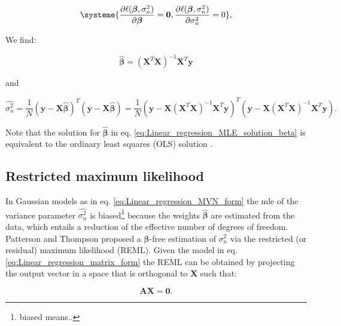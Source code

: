 \begin{equation} \label{eq:Linear_regression_MLE_system}
\systeme{
    \dfrac{\partial \ell(\boldsymbol{\beta}, \sigma_n^2)}{\partial \boldsymbol{\beta}} = \mathbf{0},
    \dfrac{\partial \ell(\boldsymbol{\beta}, \sigma_n^2)}{\partial \sigma_n^2} = 0
    },
\end{equation}

We find:

\begin{equation} \label{eq:Linear_regression_MLE_solution_beta}
\hat{\boldsymbol{\beta}} = (\mathbf{X}^T\mathbf{X})^{-1}\mathbf{X}^T\mathbf{y} 
\end{equation}

and

\begin{equation} \label{eq:Linear_regression_MLE_solution_sigma}
 \hat{\sigma_n^2} = \frac{1}{N}(\mathbf{y}-\mathbf{X}\hat{\boldsymbol{\beta}})^T(\mathbf{y}-\mathbf{X}\hat{\boldsymbol{\beta}}) = \frac{1}{N}(\mathbf{y}-\mathbf{X}(\mathbf{X}^T\mathbf{X})^{-1}\mathbf{X}^T\mathbf{y})^T(\mathbf{y}-\mathbf{X}(\mathbf{X}^T\mathbf{X})^{-1}\mathbf{X}^T\mathbf{y}). 
\end{equation}

Note that the solution for $\hat{\boldsymbol{\beta}}$ in eq. \eqref{eq:Linear_regression_MLE_solution_beta} is equivalent to the ordinary least squares (OLS) solution \cite{laird2010fundamentals}.

\newpage

\subsection{Restricted maximum likelihood}

In Gaussian models as in eq. \eqref{eq:Linear_regression_MVN_form} the \gls{mle} of the variance parameter $\hat{\sigma_n^2}$ is biased\footnote{biased means..} because the weights $\hat{\boldsymbol{\beta}}$ are estimated from the data, which entails a reduction of the effective number of degrees of freedom.
Patterson and Thompson \cite{patterson1971recovery} proposed a $\boldsymbol{\beta}$-free estimation of $\sigma_n^2$ via the restricted (or residual) maximum likelihood (REML).
Given the model in eq. \eqref{eq:Linear_regression_matrix_form} the REML can be obtained by projecting the output vector in a space that is orthogonal to $\mathbf{X}$ such that:

\begin{equation}\label{eq:REML_0_projection}
    \mathbf{A}\mathbf{X} = \mathbf{0}.
\end{equation}

